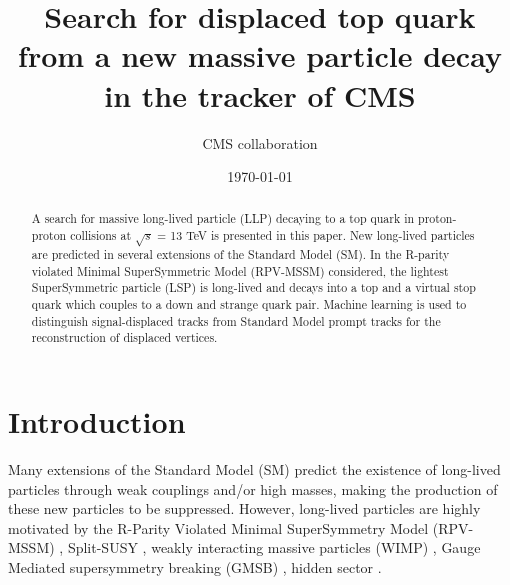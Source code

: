 \documentclass{cernatlasnote}
\title{\centering Search for displaced top quark from a new massive particle decay in the tracker of CMS}
\author{CMS collaboration}
\date{\today}
\begin{document}
\maketitle

\begin{abstract}

A search for massive long-lived particle (LLP) decaying to a top quark in proton-proton collisions at $\sqrt{s}$ = 13 TeV is presented in this paper. New long-lived particles are predicted in several extensions of the Standard Model (SM). In the R-parity violated Minimal SuperSymmetric Model (RPV-MSSM) considered, the lightest SuperSymmetric particle (LSP) is long-lived and decays into a top and a virtual stop quark which couples to a down and strange quark pair. Machine learning is used to distinguish signal-displaced tracks from Standard Model prompt tracks for the reconstruction of displaced vertices.
\end{abstract}

\vfill
\makereviewtable
\clearpage

\begingroup
\color{black}
\tableofcontents
\pagebreak
\listoffigures
\pagebreak
\listoftables
\endgroup
\pagebreak


\section{Introduction}
\label{SEC: INTRO}
Many extensions of the Standard Model (SM) predict the existence of long-lived particles through weak couplings and/or high masses, making the production of these new particles to be suppressed. However, long-lived particles are highly motivated by the R-Parity Violated Minimal SuperSymmetry Model (RPV-MSSM) \cite{RPV1, RPV2, RPV3, RPV4}, Split-SUSY \cite{SPLITSUSY, SPLITSUSY2, SPLITSUSY3, SPLITSUSY4, SPLITSUSY5, SPLITSUSY6}, weakly interacting massive particles (WIMP) \cite{WIMP1,WIMP2,WIMP3}, Gauge Mediated supersymmetry breaking (GMSB) \cite{GMSB1,GMSB2, GMSB3}, hidden sector \cite{HS1, HS2, HS3}.
\end{document}
